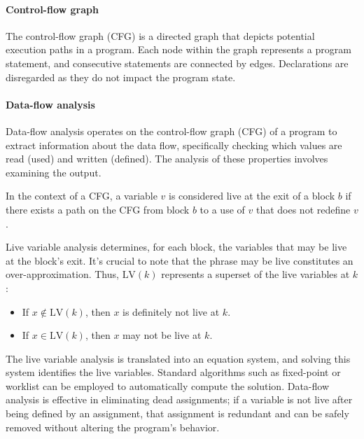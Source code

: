 \paragraph*{Control-flow graph}
The control-flow graph (CFG) is a directed graph that depicts potential execution paths in a program.
Each node within the graph represents a program statement, and consecutive statements are connected by edges.
Declarations are disregarded as they do not impact the program state.

\paragraph*{Data-flow analysis}
Data-flow analysis operates on the control-flow graph (CFG) of a program to extract information about the data flow, specifically checking which values are read (used) and written (defined).
The analysis of these properties involves examining the output.
\begin{definition}
    In the context of a CFG, a variable $v$ is considered live at the exit of a block $b$ if there exists a path on the CFG from block $b$ to a use of $v$ that does not redefine $v$.
\end{definition}
Live variable analysis determines, for each block, the variables that may be live at the block's exit.
It's crucial to note that the phrase may be live constitutes an over-approximation. 
Thus, $\text{LV}(k)$ represents a superset of the live variables at $k$:
\begin{itemize}
    \item If $x\notin\text{LV}(k)$, then $x$ is definitely not live at $k$. 
    \item If $x\in\text{LV}(k)$, then $x$ may not be live at $k$.
\end{itemize}
The live variable analysis is translated into an equation system, and solving this system identifies the live variables.
Standard algorithms such as fixed-point or worklist can be employed to automatically compute the solution.
Data-flow analysis is effective in eliminating dead assignments; if a variable is not live after being defined by an assignment, that assignment is redundant and can be safely removed without altering the program's behavior.

